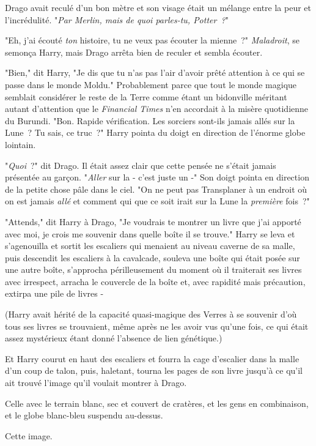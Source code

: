 Drago avait reculé d'un bon mètre et son visage était un mélange entre la peur et l'incrédulité. "\emph{Par Merlin, mais de quoi parles-tu, Potter~?}"

"Eh, j'ai écouté \emph{ton} histoire, tu ne veux pas écouter la mienne~?" \emph{Maladroit}, se semonça Harry, mais Drago arrêta bien de reculer et sembla écouter.

"Bien," dit Harry, "Je dis que tu n'as pas l'air d'avoir prêté attention à ce qui se passe dans le monde Moldu." Probablement parce que tout le monde magique semblait considérer le reste de la Terre comme étant un bidonville méritant autant d'attention que le \emph{Financial Times} n'en accordait à la misère quotidienne du Burundi. "Bon. Rapide vérification. Les sorciers sont-ils jamais allés sur la Lune~? Tu sais, ce truc~?" Harry pointa du doigt en direction de l'énorme globe lointain.

"\emph{Quoi}~?" dit Drago. Il était assez clair que cette pensée ne s'était jamais présentée au garçon. "\emph{Aller} sur la - c'est juste un -" Son doigt pointa en direction de la petite chose pâle dans le ciel. "On ne peut pas Transplaner à un endroit où on est jamais \emph{allé} et comment qui que ce soit irait sur la Lune la \emph{première} fois~?"

"Attends," dit Harry à Drago, "Je voudrais te montrer un livre que j'ai apporté avec moi, je crois me souvenir dans quelle boîte il se trouve." Harry se leva et s'agenouilla et sortit les escaliers qui menaient au niveau caverne de sa malle, puis descendit les escaliers à la cavalcade, souleva une boîte qui était posée sur une autre boîte, s'approcha périlleusement du moment où il traiterait ses livres avec irrespect, arracha le couvercle de la boîte et, avec rapidité mais précaution, extirpa une pile de livres -

(Harry avait hérité de la capacité quasi-magique des Verres à se souvenir d'où tous ses livres se trouvaient, même après ne les avoir vus qu'une fois, ce qui était assez mystérieux étant donné l'absence de lien génétique.)

Et Harry courut en haut des escaliers et fourra la cage d'escalier dans la malle d'un coup de talon, puis, haletant, tourna les pages de son livre jusqu'à ce qu'il ait trouvé l'image qu'il voulait montrer à Drago.

Celle avec le terrain blanc, sec et couvert de cratères, et les gens en combinaison, et le globe blanc-bleu suspendu au-dessus.

Cette image.

